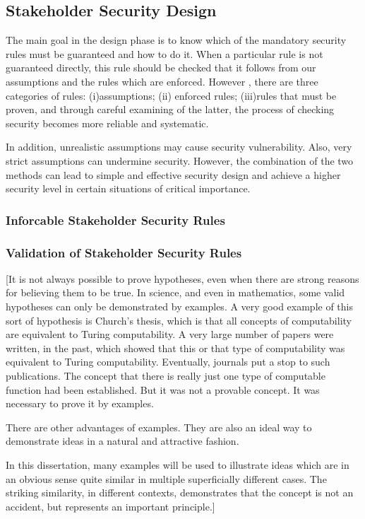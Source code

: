 \subsection{Stakeholder Security Design}\label{stsecdsgn} 
The main goal in the design phase is to know which of the mandatory security rules must be guaranteed and how to do it. When a particular  rule is not guaranteed directly,  this rule should be checked  that it follows from our assumptions and the rules which are enforced. However , there are three categories of rules: (i)assumptions; (ii) enforced rules; (iii)rules that must be proven, and through careful examining of the latter, the process of checking security becomes more reliable and systematic.

In addition, unrealistic assumptions may cause security vulnerability. Also, very strict assumptions can undermine security. However, the combination of the two methods can lead to simple and effective security design and achieve a higher security level in certain situations of critical importance.
\subsubsection{Inforcable Stakeholder Security Rules}\label{Instsecrul}
\subsubsection{Validation of Stakeholder Security Rules}\label{vlstsecrul}

[It is not always possible to prove hypotheses, even when there are strong reasons for believing
them to be true. In science, and even in mathematics, some valid hypotheses can only be demonstrated
by examples. A very good example of this sort of hypothesis is Church's thesis, which is that
all concepts of computability are equivalent to Turing computability. A very large number of papers
were written, in the past, which showed that this or that type of computability was equivalent to
Turing computability. Eventually, journals put a stop to such publications. The concept that there is
really just one type of computable function had been established. But it was not a provable concept.
It was necessary to prove it by examples.

There are other advantages of examples. They are also an ideal way to demonstrate ideas in a 
natural and attractive fashion.

In this dissertation, many examples will be used to illustrate ideas which are in an obvious
sense quite similar in multiple superficially different cases. The striking similarity, in
different contexts, demonstrates that the concept is not an accident, but represents an important
principle.]

\fi
